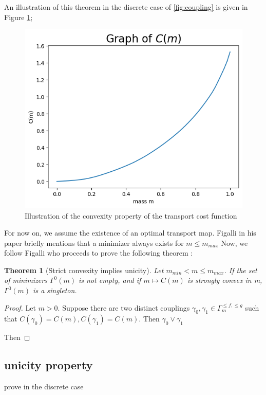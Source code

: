 \documentclass[a4paper,11pt]{article}
\newtheorem{theorem}{Theorem}
\theoremstyle{definition}
\begin{document}
An illustration of this theorem in the discrete case of \ref{fig:coupling} is given in Figure \ref{fig:conv};

\begin{figure}
    \centering
    \includegraphics[width=0.8\linewidth]{image/convexity.png}
    \caption{Illustration of the convexity property of the transport cost function}
    \label{fig:conv}
\end{figure}

For now on, we assume the existence of an optimal transport map. Figalli in his paper briefly mentions that a minimizer always exists for $m\leq m_{max}$
Now, we follow Figalli who proceeds to prove the following theorem : 

\begin{theorem}[Strict convexity implies unicity]
    Let $m_{min} < m \leq m_{max}$. If the set of minimizers $\Gamma^0(m)$ is not empty, and if $m \mapsto C(m)$ is strongly convex in m, $\Gamma^0(m)$ is a singleton.
\end{theorem}

\begin{proof}
Let $m>0$. Suppose there are two distinct couplings $\gamma_0, \gamma_1 \in \Gamma^{\leq f, \leq g}_m$ such that $C(\gamma_0) = C(m), C(\gamma_1) = C(m)$. Then $\gamma_0 \lor \gamma_1$

Then 
\end{proof}


\subsection{unicity property}

prove in the discrete case
\end{document}
